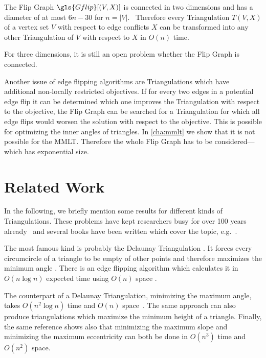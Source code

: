 \begin{theorem}
  The Flip Graph \(\gls{Gflip}[(V,X)]\) is connected in two dimensions
  \cite[Behauptung 4]{flip_graph_connected} and has a diameter of
  at most \(6n - 30\) for \(n = |V|\).~\cite{flip_graph_diameter}
  Therefore every Triangulation \(T(V,X)\) of a vertex set \(V\)
  with respect to edge conflicts \(X\) can be transformed into any
  other Triangulation of \(V\) with respect to \(X\) in \(O(n)\)
  time.
  
  For three dimensions, it is still an open problem whether
  the Flip Graph is connected.~\cite{flip_graph_3d}
\end{theorem}

Another issue of edge flipping algorithms are Triangulations
which have additional non-locally restricted objectives. If for every
two edges in a potential edge flip it can be determined which one
improves the Triangulation with respect to the objective, the Flip
Graph can be searched for a Triangulation for which all edge flips
would worsen the solution with respect to the objective. This is
possible for optimizing the inner angles of triangles. In
\cref{cha:mmlt} we show that it is not possible for the \gls{MMLT}.
Therefore the whole Flip Graph has to be considered---which has
exponential size.

\section{Related Work}
In the following, we briefly mention some results for different kinds
of Triangulations. These problems have kept researchers busy
for over 100 years already~\cite{triangulation_hilbert} and several
books have been written which cover the topic,
e.g.~\cite{triangulation_book}.

The most famous kind is probably the Delaunay Triangulation
\cite[Section 9.2]{deberg_compgeom}. It forces every circumcircle
of a triangle to be empty of other points and therefore maximizes
the minimum angle \cite[Theorem 9.9]{deberg_compgeom}. There is an
edge flipping algorithm which calculates it in \(O(n \log n)\) 
expected time using \(O(n)\) space 
\cite[Theorem 9.12]{deberg_compgeom}.

The counterpart of a Delaunay Triangulation, 
minimizing the maximum angle, takes \(O(n^2 \log n)\) time and
\(O(n)\) space~\cite{triangulation_edge_insertion}. The same
approach can also produce triangulations which maximize the minimum 
height of a triangle. Finally, the same reference shows also that 
minimizing the maximum slope and minimizing the maximum eccentricity 
can both be done in \(O(n^3)\) time and \(O(n^2)\) space.

